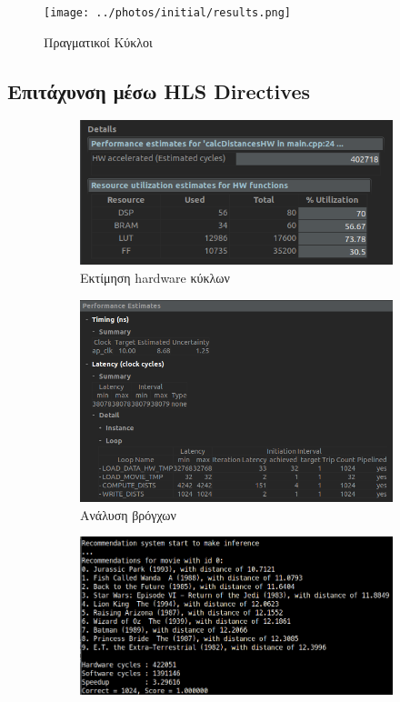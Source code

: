 \documentclass{article}
\newcommand{\eng}[1]{\foreignlanguage{english}{#1}} %
\begin{document}
\begin{figure}[ht]
    \centering
    \texttt{[image: ../photos/initial/results.png]}
    \caption{Πραγματικοί Κύκλοι}
\end{figure}

\subsection*{Επιτάχυνση μέσω \eng{HLS Directives}}

\begin{figure}
   \centering
   \begin{subfigure}{0.6\textwidth}
       \includegraphics[width=\textwidth]{../photos/fast/cycles.png} 
        \caption{Εκτίμηση \eng{hardware} κύκλων}
   \end{subfigure}
   \begin{subfigure}{0.6\textwidth}
       \includegraphics[width=\textwidth]{../photos/fast/loops.png} 
        \caption{Ανάλυση βρόγχων}
   \end{subfigure}
   \begin{subfigure}{0.6\textwidth}
       \includegraphics[width=\textwidth]{../photos/fast/results.png} 

\end{subfigure}
\end{figure}
\end{document}
